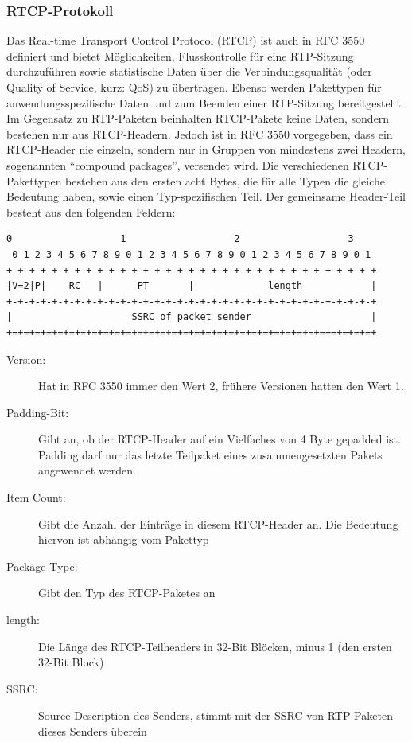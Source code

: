 \subsubsection{RTCP-Protokoll}
\label{rtcp}
Das Real-time Transport Control Protocol (RTCP) ist auch in RFC 3550 definiert und bietet Möglichkeiten, Flusskontrolle für eine RTP-Sitzung durchzuführen sowie statistische Daten über die Verbindungsqualität (oder Quality of Service, kurz: QoS) zu übertragen. Ebenso werden Pakettypen für anwendungsspezifische Daten und zum Beenden einer RTP-Sitzung bereitgestellt. Im Gegensatz zu RTP-Paketen beinhalten RTCP-Pakete keine Daten, sondern bestehen nur aus RTCP-Headern. Jedoch ist in RFC 3550 vorgegeben, dass ein RTCP-Header nie einzeln, sondern nur in Gruppen von mindestens zwei Headern, sogenannten \enquote{compound packages}, versendet wird. Die verschiedenen RTCP-Pakettypen bestehen aus den ersten acht Bytes, die für alle Typen die gleiche Bedeutung haben, sowie einen Typ-spezifischen Teil. Der gemeinsame Header-Teil besteht aus den folgenden Feldern:
\\
\begin{lstlisting}[keepspaces=true,numbers=none,label=lst=rtcpHeader,caption=RTCP Header \cite{RFC3550}]
 0                   1                   2                   3
 0 1 2 3 4 5 6 7 8 9 0 1 2 3 4 5 6 7 8 9 0 1 2 3 4 5 6 7 8 9 0 1
+-+-+-+-+-+-+-+-+-+-+-+-+-+-+-+-+-+-+-+-+-+-+-+-+-+-+-+-+-+-+-+-+
|V=2|P|    RC   |      PT       |             length            |
+-+-+-+-+-+-+-+-+-+-+-+-+-+-+-+-+-+-+-+-+-+-+-+-+-+-+-+-+-+-+-+-+
|                     SSRC of packet sender                     |
+=+=+=+=+=+=+=+=+=+=+=+=+=+=+=+=+=+=+=+=+=+=+=+=+=+=+=+=+=+=+=+=+
\end{lstlisting}
\begin{description}
\item[Version:] Hat in RFC 3550 immer den Wert 2, frühere Versionen hatten den Wert 1.
\item[Padding-Bit:] Gibt an, ob der RTCP-Header auf ein Vielfaches von 4 Byte gepadded ist. Padding darf nur das letzte Teilpaket eines zusammengesetzten Pakets angewendet werden.
\item[Item Count:] Gibt die Anzahl der Einträge in diesem RTCP-Header an. Die Bedeutung hiervon ist abhängig vom Pakettyp
\item[Package Type:] Gibt den Typ des RTCP-Paketes an
\item[length:] Die Länge des RTCP-Teilheaders in 32-Bit Blöcken, minus 1 (den ersten 32-Bit Block)
\item[SSRC:] Source Description des Senders, stimmt mit der SSRC von RTP-Paketen dieses Senders überein
\end{description}
